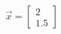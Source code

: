 \documentclass[preview]{standalone}
\begin{document}
\begin{align*}
\vec{x} = \begin{bmatrix} 2 \\ 1.5 \end{bmatrix}
\end{align*}
\end{document}
